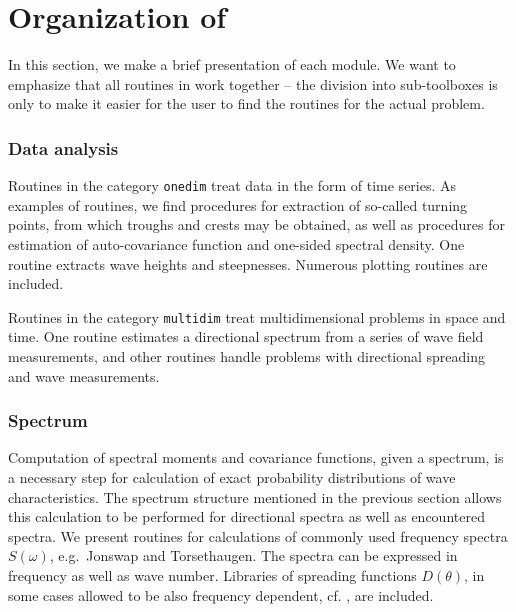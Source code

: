 \section{Organization of \progname{}}\label{sec:WAFOorganization} %

In this section, we make a brief presentation of each module.
We want to emphasize
that all routines in \progname{} work together -- the division into
sub-toolboxes is only to make it easier for the user to find the routines
for the actual problem.

\subsubsection{Data analysis}
Routines in the category {\tt onedim} treat data in the form of time series.
As examples of routines, we find procedures for extraction of
so-called turning points, from which troughs and crests may be obtained,
as well as procedures for estimation of auto-covariance function and
one-sided spectral density. One routine extracts wave heights and
steepnesses. Numerous plotting routines are included. 

Routines in the category {\tt multidim} treat multidimensional problems in 
space and time. One routine estimates a directional spectrum from a 
series of wave field measurements, and other routines handle 
problems with directional spreading and wave measurements. 

\subsubsection{Spectrum}
Computation of spectral moments and covariance
functions, given a spectrum, is a necessary step for
calculation of exact probability distributions of wave
characteristics. The spectrum structure mentioned in the
previous section allows this calculation to be performed for
directional spectra as well as encountered spectra.
We present routines for calculations of commonly used frequency
spectra $S(\omega)$, e.g.~{\sc Jonswap} and Torsethaugen. The spectra can be
expressed in frequency as well as wave number. Libraries of
spreading functions $D(\theta)$, in some cases allowed to be
also frequency dependent, cf. \cite{KrogstadAndBarstow1999Directional},
are included.%

